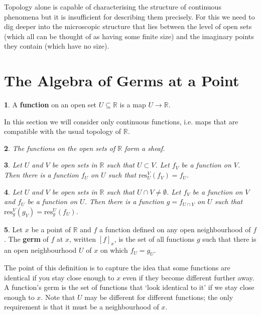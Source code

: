 \documentclass[oneside,english]{amsbook}
\numberwithin{section}{chapter}
\theoremstyle{plain}
\newtheorem{thm}{\protect\theoremname}
\theoremstyle{definition}
\newtheorem{defn}[thm]{\protect\definitionname}
\providecommand{\definitionname}{Definition}
\providecommand{\theoremname}{Theorem}
\begin{document}
		Topology alone is capable of characterising the structure of continuous phenomena but it is insufficient for describing them precisely. For this we need to dig deeper into the microscopic structure that lies between the level of open sets (which all can be thought of as having some finite size) and the imaginary points they contain (which have no size). 
		
		\section{The Algebra of Germs at a Point}
		
			\begin{defn}
				A \textbf{function} on an open set $U\subseteq \mathbb{R}$ is a map $U\to \mathbb{R}$.
			\end{defn}
			
			In this section we will consider only continuous functions, i.e. maps that are compatible with the usual topology of $\mathbb{R}$.
		
			\begin{thm}
				The functions on the open sets of $\mathbb{R}$ form a sheaf.
			\end{thm}

			\begin{thm}
				Let $U$ and $V$ be open sets in $\mathbb{R}$ such that $U\subset V$. Let $f_V$ be a function on $V$. Then there is a function $f_U$ on $U$ such that $\text{res}^V_U(f_V) = f_U$.  
			\end{thm}
			
			\begin{thm}
				Let $U$ and $V$ be open sets in $\mathbb{R}$ such that $U \cap V\ne\emptyset $. Let $f_V$ be a function on $V$ and $f_U$ be a function on $U$. Then there is a function $g = f_{U\cap V}$ on $U$ such that $\text{res}^V_g(g_V) = \text{res}^U_g(f_U)$.
			\end{thm}
			
			\begin{defn}
				Let $x$ be a point of $\mathbb{R}$ and $f$ a function defined on any open neighbourhood of $f$. The \textbf{germ} of $f$ at $x$, written $[f]_x$, is the set of all functions $g$ such that there is an open neighbourhood $U$ of $x$ on which $f_U = g_U$.  
			\end{defn}
			
			The point of this definition is to capture the idea that some functions are identical if you stay close enough to $x$ even if they become different further away. A function's germ is the set of functions that `look identical to it' if we stay close enough to $x$. Note that $U$ may be different for different functions; the only requirement is that it must be a neighbourhood of $x$.
			
\end{document}
